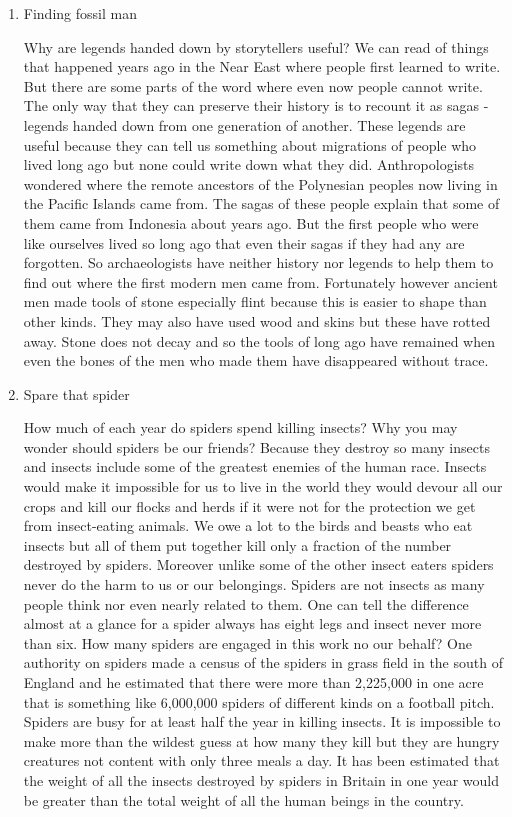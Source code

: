 \begin{enumerate}

\item    Finding fossil man 

Why are legends handed down by storytellers useful?  We can read of things that happened  years ago in the Near East where people first learned to write.
But there are some parts of the word where even now people cannot write.
The only way that they can preserve their history is to recount it as sagas - legends handed down from one generation of another.
These legends are useful because they can tell us something about migrations of people who lived long ago but none could write down what they did.
Anthropologists wondered where the remote ancestors of the Polynesian peoples now living in the Pacific Islands came from.
The sagas of these people explain that some of them came from Indonesia about  years ago.
But the first people who were like ourselves lived so long ago that even their sagas if they had any are forgotten.
So archaeologists have neither history nor legends to help them to find out where the first modern men came from.
Fortunately however ancient men made tools of stone especially flint because this is easier to shape than other kinds.
They may also have used wood and skins but these have rotted away.
Stone does not decay and so the tools of long ago have remained when even the bones of the men who made them have disappeared without trace.
\item Spare that spider

How much of each year do spiders spend killing insects?  Why you may wonder should spiders be our friends?   Because they destroy so many insects and insects include some of the greatest enemies of the human race.
Insects would make it impossible for us to live in the world they would devour all our crops and kill our flocks and herds if it were not for the protection we get from insect-eating animals.
We owe a lot to the birds and beasts who eat insects but all of them put together kill only a fraction of the number destroyed by spiders.
Moreover unlike some of the other insect eaters spiders never do the harm to us or our belongings.
Spiders are not insects as many people think nor even nearly related to them.
One can tell the difference almost at a glance for a spider always has eight legs and insect never more than six.
How many spiders are engaged in this work no our behalf?   One authority on spiders made a census of the spiders in grass field in the south of England and he estimated that there were more than 2,225,000 in one acre that is something like 6,000,000 spiders of different kinds on a football pitch.
Spiders are busy for at least half the year in killing insects.
It is impossible to make more than the wildest guess at how many they kill but they are hungry creatures not content with only three meals a day.
It has been estimated that the weight of all the insects destroyed by spiders in Britain in one year would be greater than the total weight of all the human beings in the country.
                

\end{enumerate}

